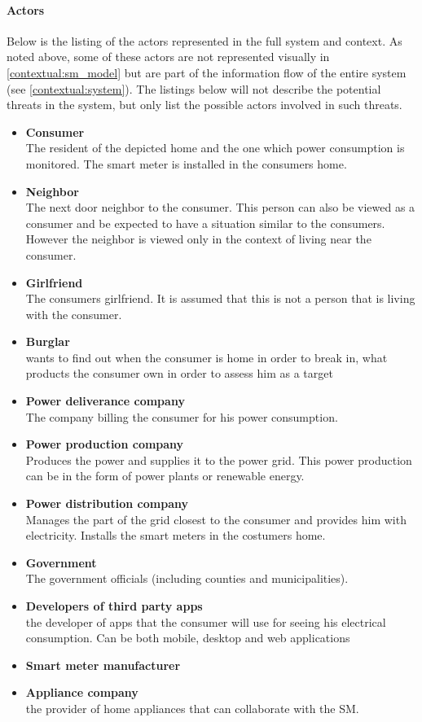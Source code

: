 \paragraph{Actors}
Below is the listing of the actors represented in the full system and context.
As noted above, some of these actors are not represented visually in \cref{contextual:sm_model} but are part of the information flow of the entire system (see \cref{contextual:system}).
The listings below will not describe the potential threats in the system, but only list the possible actors involved in such threats.
\begin{itemize}
\item \textbf{Consumer}\\
The resident of the depicted home and the one which power consumption is monitored.
The smart meter is installed in the consumers home.

\item \textbf{Neighbor}\\
The next door neighbor to the consumer.
This person can also be viewed as a consumer and be expected to have a situation similar to the consumers.
However the neighbor is viewed only in the context of living near the consumer.
\item \textbf{Girlfriend}\\
The consumers girlfriend.
It is assumed that this is not a person that is living with the consumer.
\item \textbf{Burglar}\\ wants to find out when the consumer is home in order to break in, what products the consumer own in order to assess him as a target

\item \textbf{Power deliverance company}\\
The company billing the consumer for his power consumption.
\item \textbf{Power production company}\\
Produces the power and supplies it to the power grid.
This power production can be in the form of power plants or renewable energy.
\item \textbf{Power distribution company}\\
Manages the part of the grid closest to the consumer and provides him with electricity.
Installs the smart meters in the costumers home.
\item \textbf{Government}\\
The government officials (including counties and municipalities).

\item \textbf{Developers of third party apps}\\
the developer of apps that the consumer will use for seeing his electrical consumption. Can be both mobile, desktop and web applications
\item \textbf{Smart meter manufacturer}\\
\item \textbf{Appliance company}\\ the provider of home appliances that can collaborate with the SM.
\end{itemize}

